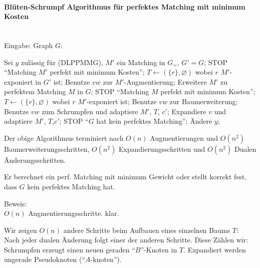 \paragraph{Blüten-Schrumpf Algorithmus für perfektes Matching mit minimum
Kosten}\mbox{}\\
Eingabe: Graph $G$:
\begin{algorithmic}
\STATE Sei $y$ zulässig für (DLPPMMG), $M'$ ein Matching in $G_{=}$,
$G'=G$;
\STATE STOP "`Matching $M'$ perfekt mit minimum Kosten"';
\ENDIF
\STATE $T \leftarrow (\{r\},\varnothing)$ wobei $r$ $M'$-exponiert in $G'$
ist;
\LOOP
{}
\STATE Benutze $v w$ zur $M'$-Augmentierung;
\STATE Erweitere $M'$ zu perfektem Matching $M$ in $G$;
\STATE STOP "`Matching $M$ perfekt mit minimum Kosten"';
\ELSE
\STATE $T\leftarrow (\{r\},\varnothing)$ wobei $r$ $M'$-exponiert ist;
\ENDIF
\ENDCASE
{}
\STATE Benutze $v w$ zur Baumerweiterung;
\ENDCASE
{}
\STATE Benutze $v w$ zum Schrumpfen und adaptiere $M'$, $T$, $c'$;
\ENDCASE
{}
\STATE Expandiere $v$ und adaptiere $M'$, $T$,$c'$;
\ENDCASE
{}
\STATE STOP "`$G$ hat kein perfektes Matching"';
\ELSE 
\STATE Ändere $y$;
\ENDIF
\ENDCASE
\ENDLOOP
\end{algorithmic}

\begin{satz}
Der obige Algorithmus terminiert nach $O(n)$ Augmentierungen und $O(n^2)$
Baumerweiterungsschritten, $O(n^2)$ Expandierungsschritten und $O(n^2)$
Dualen Änderungsschritten.

Er berechnet ein perf. Matching mit minimum Gewicht oder stellt korrekt
fest, dass $G$ kein perfektes Matching hat.
\end{satz}
Beweis:\\
$O(n)$ Augmentierungsschritte. klar.

Wir zeigen $O(n)$ andere Schritte beim Aufbauen eines einzelnen Baums
$T$:\\
Nach jeder dualen Änderung folgt einer der anderen Schritte. Diese Zählen
wir:\\
Schrumpfen erzeugt einen neuen geraden "`$B$"'-Knoten in $T$. Expandiert
werden ungerade Pseudoknoten ("`$A$-knoten"').

